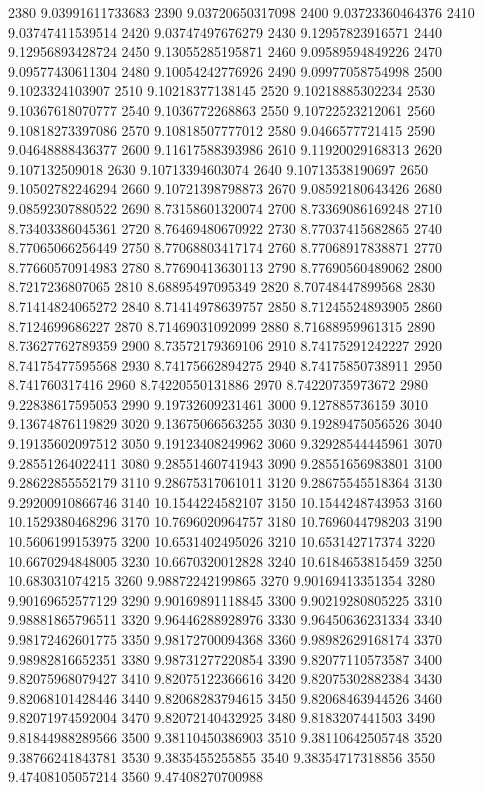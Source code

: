 {2380 9.03991611733683
2390 9.03720650317098
2400 9.03723360464376
2410 9.03747411539514
2420 9.03747497676279
2430 9.12957823916571
2440 9.12956893428724
2450 9.13055285195871
2460 9.09589594849226
2470 9.09577430611304
2480 9.10054242776926
2490 9.09977058754998
2500 9.1023324103907
2510 9.10218377138145
2520 9.10218885302234
2530 9.10367618070777
2540 9.1036772268863
2550 9.10722523212061
2560 9.10818273397086
2570 9.10818507777012
2580 9.0466577721415
2590 9.04648888436377
2600 9.11617588393986
2610 9.11920029168313
2620 9.107132509018
2630 9.10713394603074
2640 9.10713538190697
2650 9.10502782246294
2660 9.10721398798873
2670 9.08592180643426
2680 9.08592307880522
2690 8.73158601320074
2700 8.73369086169248
2710 8.73403386045361
2720 8.76469480670922
2730 8.77037415682865
2740 8.77065066256449
2750 8.77068803417174
2760 8.77068917838871
2770 8.77660570914983
2780 8.77690413630113
2790 8.77690560489062
2800 8.7217236807065
2810 8.68895497095349
2820 8.70748447899568
2830 8.71414824065272
2840 8.71414978639757
2850 8.71245524893905
2860 8.7124699686227
2870 8.71469031092099
2880 8.71688959961315
2890 8.73627762789359
2900 8.73572179369106
2910 8.74175291242227
2920 8.74175477595568
2930 8.74175662894275
2940 8.74175850738911
2950 8.741760317416
2960 8.74220550131886
2970 8.74220735973672
2980 9.22838617595053
2990 9.19732609231461
3000 9.127885736159
3010 9.13674876119829
3020 9.13675066563255
3030 9.19289475056526
3040 9.19135602097512
3050 9.19123408249962
3060 9.32928544445961
3070 9.28551264022411
3080 9.28551460741943
3090 9.28551656983801
3100 9.28622855552179
3110 9.28675317061011
3120 9.28675545518364
3130 9.29200910866746
3140 10.1544224582107
3150 10.1544248743953
3160 10.1529380468296
3170 10.7696020964757
3180 10.7696044798203
3190 10.5606199153975
3200 10.6531402495026
3210 10.653142717374
3220 10.6670294848005
3230 10.6670320012828
3240 10.6184653815459
3250 10.683031074215
3260 9.98872242199865
3270 9.90169413351354
3280 9.90169652577129
3290 9.90169891118845
3300 9.90219280805225
3310 9.98881865796511
3320 9.96446288928976
3330 9.96450636231334
3340 9.98172462601775
3350 9.98172700094368
3360 9.98982629168174
3370 9.98982816652351
3380 9.98731277220854
3390 9.82077110573587
3400 9.82075968079427
3410 9.82075122366616
3420 9.82075302882384
3430 9.82068101428446
3440 9.82068283794615
3450 9.82068463944526
3460 9.82071974592004
3470 9.82072140432925
3480 9.8183207441503
3490 9.81844988289566
3500 9.38110450386903
3510 9.38110642505748
3520 9.38766241843781
3530 9.3835455255855
3540 9.38354717318856
3550 9.47408105057214
3560 9.47408270700988
}
